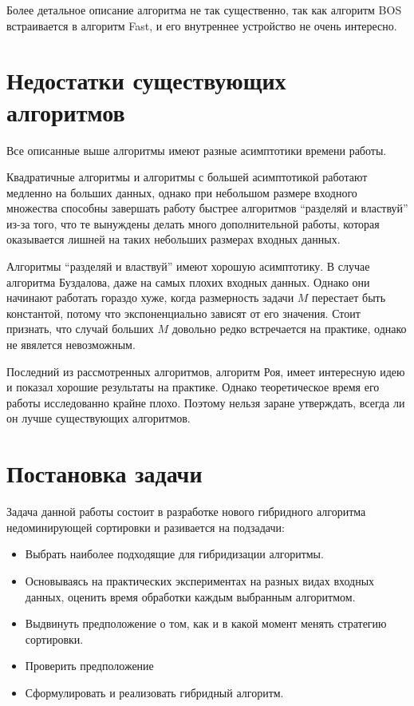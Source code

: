 Более детальное описание алгоритма не так существенно, так как алгоритм BOS встраивается в алгоритм Fast, и его внутреннее устройство не очень интересно. 



\section{Недостатки существующих алгоритмов}

Все описанные выше алгоритмы имеют разные асимптотики времени работы. 

Квадратичные алгоритмы и алгоритмы с большей асимптотикой работают медленно на больших данных, однако при небольшом
размере входного множества способны завершать работу быстрее алгоритмов ``разделяй и властвуй'' из-за того, что те
вынуждены делать много дополнительной работы, которая оказывается лишней на таких небольших размерах входных данных.

Алгоритмы ``разделяй и властвуй'' имеют хорошую асимптотику. В случае алгоритма Буздалова, даже на самых плохих входных 
данных. Однако они начинают работать гораздо хуже, когда размерность задачи $M$ перестает быть константой, потому что 
экспоненциально зависят от его значения. Стоит признать, что случай больших $M$ довольно редко встречается на практике,
однако не явялется невозможным.

Последний из рассмотренных алгоритмов, алгоритм Роя, имеет интересную идею и показал хорошие результаты 
на практике. Однако теоретическое время его работы исследованно крайне плохо. Поэтому нельзя заране утверждать, всегда 
ли он лучше существующих алгоритмов.


\section{Постановка задачи}

Задача данной работы состоит в разработке нового гибридного алгоритма недоминирующей сортировки и разивается на подзадачи: 
\begin{itemize}
	\item Выбрать наиболее подходящие для гибридизации алгоритмы.
	\item Основываясь на практических экспериментах на разных видах входных данных, оценить время обработки каждым
	выбранным алгоритмом.
	\item Выдвинуть предположение о том, как и в какой момент менять стратегию сортировки. 
	\item Проверить предположение
	\item Сформулировать и реализовать гибридный алгоритм.
\end{itemize}
